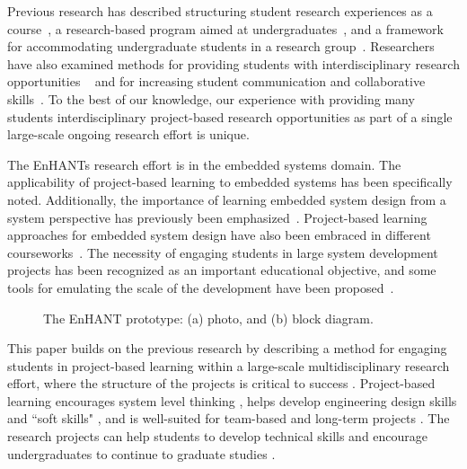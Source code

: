 \documentclass[journal,twopages]{IEEEtran}
\begin{document}
\label{sect:Related}




Previous research has described structuring student research experiences as a course~\cite{polack2006learning,Greening2002Undergraduate}, a research-based program aimed at undergraduates~\cite{peckham2007increasing}, and a framework for accommodating undergraduate students in a research group~\cite{Bernat2000structuring,wenderholm2004challenges}. Researchers have also examined methods for providing students with interdisciplinary research opportunities ~\cite{raicu2009enhancing} and for increasing student communication and collaborative skills~\cite{Coleman2012Collaboration}. To the best of our knowledge, our experience with providing many students interdisciplinary project-based research opportunities as part of a single large-scale ongoing research effort is unique.

The EnHANTs research effort is in the embedded systems domain.
The applicability of project-based learning to embedded systems has been specifically noted. Additionally, the importance of learning embedded system design from a system perspective has previously been emphasized~\cite{wolf2000embedded}.
Project-based learning approaches for embedded system design have also been embraced in different courseworks~\cite{lee2010project,hussmann2007crazy}. The necessity of engaging students in large system development projects has been recognized as an important educational objective, and some tools for emulating the scale of the development have been proposed~\cite{schocken2012taming}.




 
\label{sect:Objectives}











\begin{figure}[t]
\centering
{}
\vspace*{-0.35cm}
\caption{The EnHANT prototype: (a) photo, and (b) block diagram. \label{fig:protSchem}}
\end{figure}

This paper builds on the previous research by describing a method for engaging students in project-based learning within a large-scale multidisciplinary research effort, where the structure of the projects is critical to success \cite{saliklis2006putting}.
Project-based learning encourages system level thinking \cite{savage2007integrating}, helps develop engineering design skills \cite{dym2005engineering} and ``soft skills" \cite{hadim2002enhancing}, and is well-suited for team-based \cite{felder2000future} and long-term projects \cite{mills2003engineering}.
The research projects can help students to develop technical skills and encourage undergraduates to continue to graduate studies \cite{zydney2002impact}.
\end{document}
